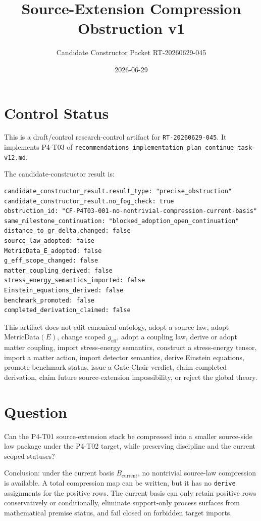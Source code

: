 \documentclass[11pt]{article}
\title{Source-Extension Compression Obstruction v1}
\author{Candidate Constructor Packet RT-20260629-045}
\date{2026-06-29}
\newcommand{\MetricData}{\mathrm{MetricData}}
\newcommand{\geff}{g_{\mathrm{eff}}}
\newcommand{\NoTargetImport}{\mathrm{NoTargetImport}}
\newcommand{\Bcur}{B_{\mathrm{current}}}
\begin{document}
\maketitle

\section{Control Status}

This is a draft/control research-control artifact for
\texttt{RT-20260629-045}. It implements P4-T03 of
\texttt{recommendations\_implementation\_plan\_continue\_task-v12.md}.

The candidate-constructor result is:

\begin{verbatim}
candidate_constructor_result.result_type: "precise_obstruction"
candidate_constructor_result.no_fog_check: true
obstruction_id: "CF-P4T03-001-no-nontrivial-compression-current-basis"
same_milestone_continuation: "blocked_adoption_open_continuation"
distance_to_gr_delta.changed: false
source_law_adopted: false
MetricData_E_adopted: false
g_eff_scope_changed: false
matter_coupling_derived: false
stress_energy_semantics_imported: false
Einstein_equations_derived: false
benchmark_promoted: false
completed_derivation_claimed: false
\end{verbatim}

This artifact does not edit canonical ontology, adopt a source law, adopt
\(\MetricData(E)\), change scoped \(\geff\), adopt a coupling law, derive or
adopt matter coupling, import stress-energy semantics, construct a
stress-energy tensor, import a matter action, import detector semantics, derive
Einstein equations, promote benchmark status, issue a Gate Chair verdict,
claim completed derivation, claim future source-extension impossibility, or
reject the global theory.

\section{Question}

Can the P4-T01 source-extension stack be compressed into a smaller
source-side law package under the P4-T02 target, while preserving
\NoTargetImport{} discipline and the current scoped statuses?

Conclusion: under the current basis \(\Bcur\), no nontrivial source-law
compression is available. A total compression map can be written, but it has
no \texttt{derive} assignments for the positive rows. The current basis can
only retain positive rows conservatively or conditionally, eliminate
support-only process surfaces from mathematical premise status, and fail
closed on forbidden target imports.
\end{document}
